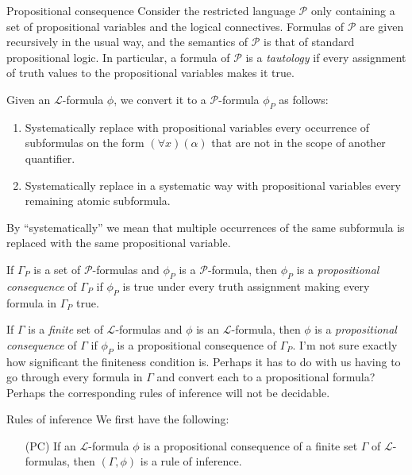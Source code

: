 \documentclass[article, a4paper, 11pt, oneside]{memoir}
\numberwithin{equation}{chapter}
\newcommand{\calP}{\mathcal{P}}
\newcommand{\calL}{\mathcal{L}}
\theoremstyle{nonumberplain}
\begin{document}
\begin{notelist}
    \item[Propositional consequence]
    Consider the restricted language $\calP$ only containing a set of propositional variables and the logical connectives. Formulas of $\calP$ are given recursively in the usual way, and the semantics of $\calP$ is that of standard propositional logic. In particular, a formula of $\calP$ is a \emph{tautology} if every assignment of truth values to the propositional variables makes it true.

    Given an $\calL$-formula $\phi$, we convert it to a $\calP$-formula $\phi_P$ as follows:
    \begin{enumerate}
        \item Systematically replace with propositional variables every occurrence of subformulas on the form $(\forall x)(\alpha)$ that are not in the scope of another quantifier.
        \item Systematically replace in a systematic way with propositional variables every remaining atomic subformula.
    \end{enumerate}
    By \enquote{systematically} we mean that multiple occurrences of the same subformula is replaced with the same propositional variable. 

    If $\Gamma_P$ is a set of $\calP$-formulas and $\phi_P$ is a $\calP$-formula, then $\phi_P$ is a \emph{propositional consequence} of $\Gamma_P$ if $\phi_P$ is true under every truth assignment making every formula in $\Gamma_P$ true.

    If $\Gamma$ is a \emph{finite} set of $\calL$-formulas and $\phi$ is an $\calL$-formula, then $\phi$ is a \emph{propositional consequence} of $\Gamma$ if $\phi_P$ is a propositional consequence of $\Gamma_P$. I'm not sure exactly how significant the finiteness condition is. Perhaps it has to do with us having to go through every formula in $\Gamma$ and convert each to a propositional formula? Perhaps the corresponding rules of inference will not be decidable.

    \item[Rules of inference]
    We first have the following:
    \begin{enumerate}
        \item[(PC)] If an $\calL$-formula $\phi$ is a propositional consequence of a finite set $\Gamma$ of $\calL$-formulas, then $(\Gamma,\phi)$ is a rule of inference.
    \end{enumerate}
    

\end{notelist}
\end{document}
